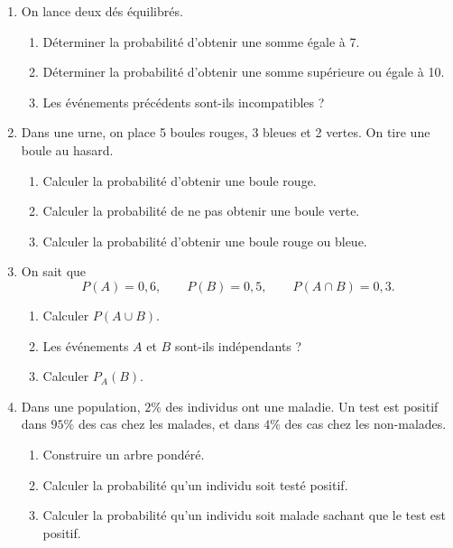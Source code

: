 \documentclass[11pt,a4paper]{article}
\begin{document}
\begin{enumerate}[label=\textbf{Exercice \arabic*.}, leftmargin=*, itemsep=1em]

\item On lance deux dés équilibrés.

\begin{enumerate}[label=\alph*)]
    \item Déterminer la probabilité d'obtenir une somme égale à 7.
    \item Déterminer la probabilité d'obtenir une somme supérieure ou égale à 10.
    \item Les événements précédents sont-ils incompatibles ?
\end{enumerate}

\item Dans une urne, on place 5 boules rouges, 3 bleues et 2 vertes.  
On tire une boule au hasard.

\begin{enumerate}[label=\alph*)]
    \item Calculer la probabilité d'obtenir une boule rouge.
    \item Calculer la probabilité de ne pas obtenir une boule verte.
    \item Calculer la probabilité d'obtenir une boule rouge ou bleue.
\end{enumerate}

\item On sait que
\[
P(A)=0{,}6,\qquad P(B)=0{,}5,\qquad P(A\cap B)=0{,}3.
\]

\begin{enumerate}[label=\alph*)]
    \item Calculer \(P(A\cup B)\).
    \item Les événements \(A\) et \(B\) sont-ils indépendants ?
    \item Calculer \(P_A(B)\).
\end{enumerate}

\item Dans une population, \(2\%\) des individus ont une maladie.  
Un test est positif dans \(95\%\) des cas chez les malades, et dans \(4\%\) des cas chez les non-malades.

\begin{enumerate}[label=\alph*)]
    \item Construire un arbre pondéré.
    \item Calculer la probabilité qu'un individu soit testé positif.
    \item Calculer la probabilité qu'un individu soit malade sachant que le test est positif.
\end{enumerate}


\end{enumerate}
\end{document}

